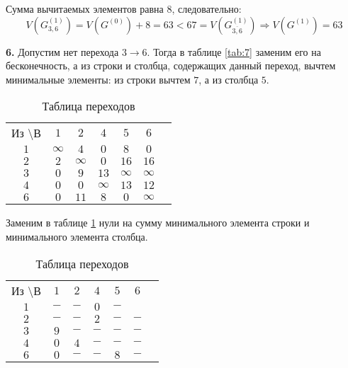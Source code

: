 Сумма вычитаемых элементов равна $8$, следовательно:
\begin{equation*}
V(G_{3,6}^{(1)}) = V(G^{(0)}) + 8 = 63 < 67 = V(G_{\overline{3,6}}^{(1)}) \Rightarrow V(G^{(1)}) = 63
\end{equation*}

\textbf{6.} Допустим нет перехода $3 \rightarrow 6$. Тогда в таблице \ref{tab:7} заменим его на бесконечность, а из строки и столбца, содержащих данный переход, вычтем минимальные элементы: из строки вычтем $7$, а из столбца $5$.

\begin{table}[H]
\begin{center}
	\def\tabcolsep{15pt}
	\caption{Таблица переходов}
	\label{tab:28}
	\begin{tabular}{|c||c|c|c|c|c|c|}
		\hline
		Из \textbackslash В & $1$ & $2$ & $4$ & $5$ & $6$ \\
		\hhline{|=#=|=|=|=|=|}
		$1$ & $\infty$ & $4$ & $0$ & $8$ & $0$ \\
		\hline
		$2$ & $2$ & $\infty$ & $0$ & $16$ & $16$ \\
		\hline
		$3$ & $0$ & $9$ & $13$ & $\infty$ & $\infty$ \\ 
		\hline
		$4$ & $0$ & $0$ & $\infty$ & $13$ & $12$ \\
		\hline
		$6$ & $0$ & $11$ & $8$ & $0$ & $\infty$ \\
		\hline
	\end{tabular}
\end{center}
\end{table}

Заменим в таблице \ref{tab:28} нули на сумму минимального элемента строки и минимального элемента столбца. 

\begin{table}[H]
\begin{center}
	\def\tabcolsep{15pt}
	\caption{Таблица переходов}
	\label{tab:111}
	\begin{tabular}{|c||c|c|c|c|c|c|}
		\hline
		Из \textbackslash В & $1$ & $2$ & $4$ & $5$ & $6$ \\
		\hhline{|=#=|=|=|=|=|}
		$1$ & $-$ & $-$ & $0$ & $-$ & \redbold{$12$} \\
		\hline
		$2$ & $-$ & $-$ & $2$ & $-$ & $-$ \\
		\hline
		$3$ & $9$ & $-$ & $-$ & $-$ & $-$ \\ 
		\hline
		$4$ & $0$ & $4$ & $-$ & $-$ & $-$ \\
		\hline
		$6$ & $0$ & $-$ & $-$ & $8$ & $-$ \\
		\hline
	\end{tabular}
\end{center}
\end{table}

